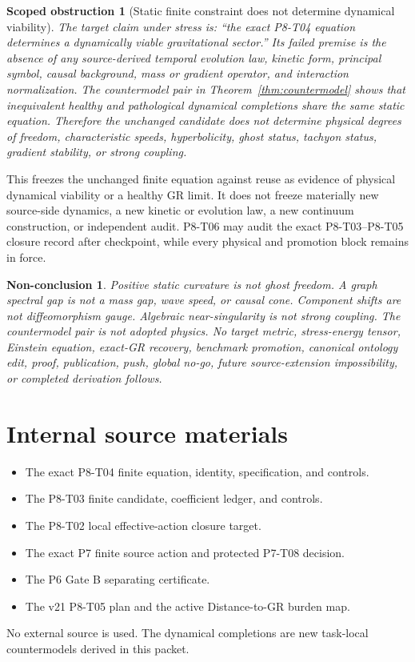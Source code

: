 \documentclass[11pt]{article}
\newtheorem{obstruction}{Scoped obstruction}
\newtheorem{nonconclusion}{Non-conclusion}
\begin{document}
\begin{obstruction}[Static finite constraint does not determine dynamical
viability]
\label{obs:dynamics}
The target claim under stress is: ``the exact P8-T04 equation determines a
dynamically viable gravitational sector.''  Its failed premise is the
absence of any source-derived temporal evolution law, kinetic form,
principal symbol, causal background, mass or gradient operator, and
interaction normalization.  The countermodel pair in
Theorem~\ref{thm:countermodel} shows that inequivalent healthy and
pathological dynamical completions share the same static equation.
Therefore the unchanged candidate does not determine physical degrees of
freedom, characteristic speeds, hyperbolicity, ghost status, tachyon
status, gradient stability, or strong coupling.
\end{obstruction}

This freezes the unchanged finite equation against reuse as evidence of
physical dynamical viability or a healthy GR limit.  It does not freeze
materially new source-side dynamics, a new kinetic or evolution law, a new
continuum construction, or independent audit.  P8-T06 may audit the exact
P8-T03--P8-T05 closure record after checkpoint, while every physical and
promotion block remains in force.

\begin{nonconclusion}
Positive static curvature is not ghost freedom.  A graph spectral gap is
not a mass gap, wave speed, or causal cone.  Component shifts are not
diffeomorphism gauge.  Algebraic near-singularity is not strong coupling.
The countermodel pair is not adopted physics.  No target metric,
stress-energy tensor, Einstein equation, exact-GR recovery, benchmark
promotion, canonical ontology edit, proof, publication, push, global no-go,
future source-extension impossibility, or completed derivation follows.
\end{nonconclusion}

\section{Internal source materials}

\begin{itemize}
 \item The exact P8-T04 finite equation, identity, specification, and
 controls.
 \item The P8-T03 finite candidate, coefficient ledger, and controls.
 \item The P8-T02 local effective-action closure target.
 \item The exact P7 finite source action and protected P7-T08 decision.
 \item The P6 Gate B separating certificate.
 \item The v21 P8-T05 plan and the active Distance-to-GR burden map.
\end{itemize}

No external source is used.  The dynamical completions are new
task-local countermodels derived in this packet.
\end{document}
